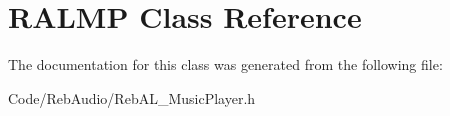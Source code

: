 \hypertarget{class_r_a_l_m_p}{}\section{R\+A\+L\+MP Class Reference}
\label{class_r_a_l_m_p}


The documentation for this class was generated from the following file\+:\begin{DoxyCompactItemize}
\item 
Code/\+Reb\+Audio/Reb\+A\+L\+\_\+\+Music\+Player.\+h\end{DoxyCompactItemize}
